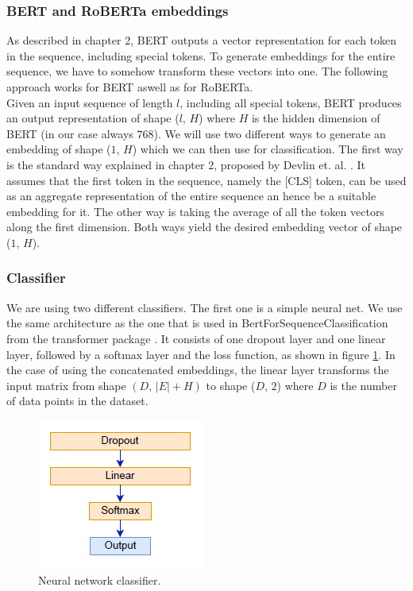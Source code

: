 \subsubsection{BERT and RoBERTa embeddings}
As described in chapter 2, BERT outputs a vector representation for each token in the sequence, including special tokens. To generate embeddings for the entire sequence, we have to somehow transform these vectors into one. The following approach works for BERT aswell as for RoBERTa.\\
Given an input sequence of length $l$, including all special tokens, BERT produces an output representation of shape ($l$, $H$) where $H$ is the hidden dimension of BERT (in our case always $768$). We will use two different ways to generate an embedding of shape ($1$, $H$) which we can then use for classification. The first way is the standard way explained in chapter 2, proposed by Devlin et. al. \cite{bert}. It assumes that the first token in the sequence, namely the [CLS] token, can be used as an aggregate representation of the entire sequence an hence be a suitable embedding for it. The other way is taking the average of all the token vectors along the first dimension. Both ways yield the desired embedding vector of shape ($1$, $H$).

\subsubsection{Classifier}
We are using two different classifiers. The first one is a simple neural net. We use the same architecture as the one that is used in BertForSequenceClassification from the transformer package \cite{bertimpl}. It consists of one dropout layer and one linear layer, followed by a softmax layer and the loss function, as shown in figure \ref{fig:nn1}. In the case of using the concatenated embeddings, the linear layer transforms the input matrix from shape $(D, \, |E| + H)$ to shape ($D$, $2$) where $D$ is the number of data points in the dataset. 

\begin{figure}[h]
  \centering
  \includegraphics[scale=1]{fig/nn_1.png}
  \caption{Neural network classifier.}%
  \label{fig:nn1}
\end{figure}

